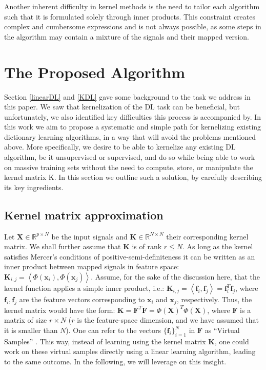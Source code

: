 \documentclass[journal]{IEEEtran}
\newcommand{\bx}{\mathbf{x}}
\newcommand{\bbf}{\mathbf{f}}
\newcommand{\bX}{\mathbf{X}}
\newcommand{\bK}{\mathbf{K}}
\newcommand{\bF}{\mathbf{F}}
\begin{document}
Another inherent difficulty in kernel methods is the need to tailor each algorithm such that it is formulated solely through inner products. This constraint creates complex and cumbersome expressions and is not always possible, as some steps in the algorithm may contain a mixture of the signals and their mapped version.

\section{The Proposed Algorithm} \label{LKDL}

Section \ref{linearDL} and \ref{KDL} gave some background to the task we address in this paper. We saw that kernelization of the DL task can be beneficial, but unfortunately, we also identified key difficulties this process is accompanied by. In this work we aim to propose a systematic and simple path for kernelizing existing dictionary learning algorithms, in a way that will avoid the problems mentioned above. More specifically, we desire to be able to kernelize any existing DL algorithm, be it unsupervised or supervised, and do so while being able to work on massive training sets without the need to compute, store, or manipulate the kernel matrix K. In this section we outline such a solution, by carefully describing its key ingredients.

\subsection{Kernel matrix approximation} \label{SS:KernelMatApprox}

Let $\bX \in \mathbb{R}^{p \times N}$ be the input signals and $\bK \in \mathbb{R}^{N \times N}$ their corresponding kernel matrix. We shall further assume that $\bK$ is of rank $r \le N$. As long as the kernel satisfies Mercer's conditions of positive-semi-definiteness it can be written as an inner product between mapped signals in feature space: $\bK_{i,j}=\left<\Phi(\bx_i),\Phi(\bx_j)\right>$. Assume, for the sake of the discussion here, that the kernel function applies a simple inner product, i.e.: $\bK_{i,j}=\left<\bbf_i,\bbf_j\right>=\bbf_i^T\bbf_j$, where $\bbf_i,\bbf_j$ are the feature vectors corresponding to $\bx_i$ and $\bx_j$, respectively. Thus, the kernel matrix would have the form: $\bK=\bF^T\bF=\Phi(\bX)^T\Phi(\bX)$, where $\bF$ is a matrix of size $r \times N$ ($r$ is the feature-space dimension, and we have assumed that it is smaller than $N$). One can refer to the vectors $\{\bbf_i\}_{i=1}^N$ in $\bF$ as ``Virtual Samples'' \cite{LinearizedKSVM}. This way, instead of  learning using the kernel matrix $\bK$, one could work on these virtual samples directly using a linear learning algorithm, leading to the same outcome. In the following, we will leverage on this insight.
\end{document}
